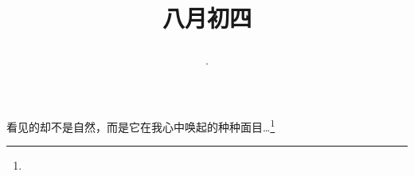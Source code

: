 \title{\date[d=6,m=9,y=2024][year:cn-y,年,month:cn,day:cn,日,·,weekday]·八月初四 }
看见的却不是自然，而是它在我心中唤起的种种面目…\footnote{ }

